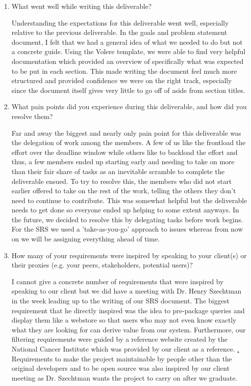 \begin{enumerate}
  \item What went well while writing this deliverable? 

  \par{ Understanding the expectations for this deliverable went well, especially relative to the previous deliverable. In the goals and problem statement
  document, I felt that we had a general idea of what we needed to do but not a concrete guide. Using the Volere template, we were able to find very helpful
  documentation which provided an overview of specifically what was expected to be put in each section. This made writing the document feel much more structured
  and provided confidence we were on the right track, especially since the document itself gives very little to go off of aside from section titles.}

  \item What pain points did you experience during this deliverable, and how did
  you resolve them?

  \par{ Far and away the biggest and nearly only pain point for this deliverable was the delegation of work among the members. A few of us like the frontload
  the effort over the deadline window while others like to backload the effort and thus, a few members ended up starting early and needing to take on more
  than their fair share of tasks as an inevitable scramble to complete the deliverable ensued. To try to resolve this, the members who did not start earlier offered
  to take on the rest of the work, telling the others they don't need to continue to contribute. This was somewhat helpful but the deliverable needs to get done
  so everyone ended up helping to some extent anyways. In the future, we decided to resolve this by delegating tasks before work begins. For the SRS
  we used a 'take-as-you-go' approach to issues whereas from now on we will be assigning everything ahead of time. }


  \item How many of your requirements were inspired by speaking to your
  client(s) or their proxies (e.g. your peers, stakeholders, potential users)?

\par{I cannot give a concrete number of requirements that were inspired by speaking to our client but we did have a meeting with Dr. Henry Szechtman
in the week leading up to the writing of our SRS document. The biggest requirement that he directly inspired was the idea to pre-package queries
and display them like a webstore so that users who may not even know exactly what they are looking for can derive value from our system. Furthermore,
our filtering requirements were guided by a reference website created by the National Cancer Institute which
was provided by our client as a reference. \href{https://portal.gdc.cancer.gov/analysis_page?app=CohortBuilder&tab=general.}. Requirements
to make the project maintainable by people other than the original developers and to be open source was also inspired by our client meeting as Dr. Szechtman wants the
project to carry on after we graduate.
}


\end{enumerate}
